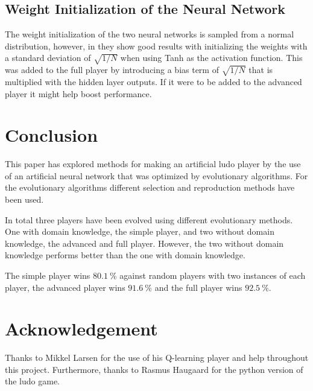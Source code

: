 \documentclass{llncs}
\begin{document}
\subsection{Weight Initialization of the Neural Network} \label{subsec:weight_init}
The weight initialization of the two neural networks is sampled from a normal distribution, however, in \cite{tanh_activations} they show good results with initializing the weights with a standard deviation of $\sqrt{1/N}$ when using Tanh as the activation function. This was added to the full player by introducing a bias term of $\sqrt{1/N}$ that is multiplied with the hidden layer outputs. If it were to be added to the advanced player it might help boost performance.

\section{Conclusion} \label{sec:conclusion}
This paper has explored methods for making an artificial ludo player by the use of an artificial neural network that was optimized by evolutionary algorithms. For the evolutionary algorithms different selection and reproduction methods have been used.

In total three players have been evolved using different evolutionary methods. One with domain knowledge, the simple player, and two without domain knowledge, the advanced and full player. However, the two without domain knowledge performs better than the one with domain knowledge.

The simple player wins $80.1\ \%$ against random players with two instances of each player, the advanced player wins $91.6\ \%$ and the full player wins $92.5\ \%$.

\section{Acknowledgement} \label{sec:acknowledgement}

Thanks to Mikkel Larsen for the use of his Q-learning player and help throughout this project. Furthermore, thanks to Rasmus Haugaard for the python version of the ludo game.
\end{document}
